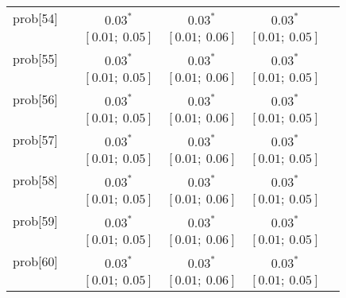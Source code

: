 \begin{table}
\begin{center}
\begin{tabular}{l c c c c c }
prob[54]    &                                  & $0.03^{*}$                & $0.03^{*}$                & $0.03^{*}$              &                         \\
            &                                  & $[0.01;\ 0.05]$           & $[0.01;\ 0.06]$           & $[0.01;\ 0.05]$         &                         \\
prob[55]    &                                  & $0.03^{*}$                & $0.03^{*}$                & $0.03^{*}$              &                         \\
            &                                  & $[0.01;\ 0.05]$           & $[0.01;\ 0.06]$           & $[0.01;\ 0.05]$         &                         \\
prob[56]    &                                  & $0.03^{*}$                & $0.03^{*}$                & $0.03^{*}$              &                         \\
            &                                  & $[0.01;\ 0.05]$           & $[0.01;\ 0.06]$           & $[0.01;\ 0.05]$         &                         \\
prob[57]    &                                  & $0.03^{*}$                & $0.03^{*}$                & $0.03^{*}$              &                         \\
            &                                  & $[0.01;\ 0.05]$           & $[0.01;\ 0.06]$           & $[0.01;\ 0.05]$         &                         \\
prob[58]    &                                  & $0.03^{*}$                & $0.03^{*}$                & $0.03^{*}$              &                         \\
            &                                  & $[0.01;\ 0.05]$           & $[0.01;\ 0.06]$           & $[0.01;\ 0.05]$         &                         \\
prob[59]    &                                  & $0.03^{*}$                & $0.03^{*}$                & $0.03^{*}$              &                         \\
            &                                  & $[0.01;\ 0.05]$           & $[0.01;\ 0.06]$           & $[0.01;\ 0.05]$         &                         \\
prob[60]    &                                  & $0.03^{*}$                & $0.03^{*}$                & $0.03^{*}$              &                         \\
            &                                  & $[0.01;\ 0.05]$           & $[0.01;\ 0.06]$           & $[0.01;\ 0.05]$         &                         \\

\end{tabular}
\end{center}
\end{table}
